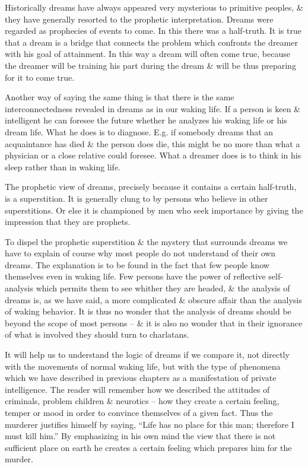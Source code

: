 \documentclass{article}
\begin{document}
Historically dreams have always appeared very mysterious to primitive peoples, \& they have generally resorted to the prophetic interpretation. Dreams were regarded as prophecies of events to come. In this there was a half-truth. It is true that a dream is a bridge that connects the problem which confronts the dreamer with his goal of attainment. In this way a dream will often come true, because the dreamer will be training his part during the dream \& will be thus preparing for it to come true.

Another way of saying the same thing is that there is the same interconnectedness revealed in dreams as in our waking life. If a person is keen \& intelligent he can foresee the future whether he analyzes his waking life or his dream life. What he does is to diagnose. E.g. if somebody dreams that an acquaintance has died \& the person does die, this might be no more than what a physician or a close relative could foresee. What a dreamer does is to think in his sleep rather than in waking life.

The prophetic view of dreams, precisely because it contains a certain half-truth, is a superstition. It is generally clung to by persons who believe in other superstitions. Or else it is championed by men who seek importance by giving the impression that they are prophets.

To dispel the prophetic superstition \& the mystery that surrounds dreams we have to explain of course why most people do not understand of their own dreams. The explanation is to be found in the fact that few people know themselves even in waking life. Few persons have the power of reflective self-analysis which permits them to see whither they are headed, \& the analysis of dreams is, as we have said, a more complicated \& obscure affair than the analysis of waking behavior. It is thus no wonder that the analysis of dreams should be beyond the scope of most persons -- \& it is also no wonder that in their ignorance of what is involved they should turn to charlatans.

It will help us to understand the logic of dreams if we compare it, not directly with the movements of normal waking life, but with the type of phenomena which we have described in previous chapters as a manifestation of private intelligence. The reader will remember how we described the attitudes of criminals, problem children \& neurotics -- how they create a certain feeling, temper or mood in order to convince themselves of a given fact. Thus the murderer justifies himself by saying, ``Life has no place for this man; therefore I must kill him.'' By emphasizing in his own mind the view that there is not sufficient place on earth he creates a certain feeling which prepares him for the murder.
\end{document}
